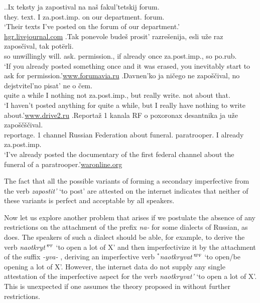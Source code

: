 \ex.\label{ex:zapostivat}\ag.Ix teksty ja zapostival na na\v{s} fakul'tetskij forum.\\
they. text. I za.post.imp. on our department. forum.\\
\trans `Their texts I've posted on the forum of our department.'\\\hbox{}\hfill\hbox{\url{hgr.livejournal.com}}
\bg.Tak ponevole bude\v{s} prosit' razre\v{s}enija, esli u\v{z}e raz zapos\v{c}ival, tak pot\"{e}rli.\\
so unwillingly will. ask. permission., if already once za.post.imp., so po.rub.\\
\trans `If you already posted something once and it was erased, you inevitably start to ask for permission.'\hbox{}\hfill\hbox{\url{www.forumavia.ru}}
\bg.Davnen'ko ja ni\v{c}ego ne zapo\v{s}\v{c}ival, no dejstvitel'no pisat' ne o \v{c}em.\\
{quite a while} I nothing not za.post.imp., but really write. not about that.\\
\trans `I haven't posted anything for quite a while, but I really have nothing to write about.'\hbox{}\hfill\hbox{\url{www.drive2.ru}}
\bg.Reporta\v{z} 1 kanala RF o poxoronax desantnika ja u\v{z}e zapo\v{s}\v{c}\v{s}\v{c}ival.\\
reportage. 1 channel {Russian Federation} about funeral. paratrooper. I already za.post.imp.\\
\trans `I've already posted the documentary of the first federal channel about the funeral of a paratrooper.'\hbox{}\hfill\hbox{\url{waronline.org}}

The fact that all the possible variants of forming a secondary imperfective  from the verb \textit{zapostit'} `to post' are attested on the internet indicates that neither of these variants is perfect and acceptable by all speakers.

Now let us explore another problem that arises if we postulate the absence of any restrictions on the attachment of the prefix \textit{na-}   for some dialects of Russian, as \citet{Tatevosov:13a} does. The speakers of such a dialect should be able, for example, to derive the verb \textit{naotkryt'}$^{\textsc{pf}}$ `to open a lot of X' and then imperfectivize it by the attachment of the suffix \textit{-yva-} , deriving an imperfective verb  $^*$\textit{naotkryvat'}$^{\textsc{ipf}}$ `to open/be opening a lot of X'. However, the internet data do not supply any single attestation of the imperfective aspect for the verb \textit{naotkryvat'} `to open a lot of X'. This is unexpected if one assumes the theory proposed in \citet{Tatevosov:13a} without further restrictions.

